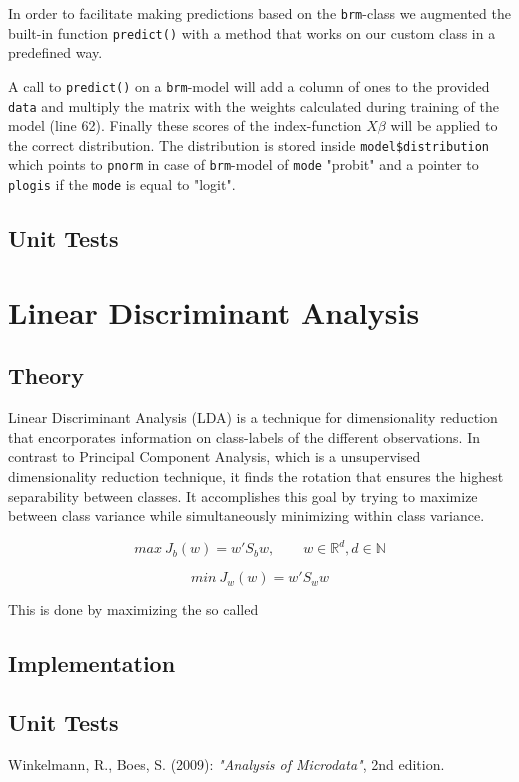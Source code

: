 \documentclass{article}
\begin{document}
In order to facilitate making predictions based on the \texttt{brm}-class we augmented the built-in function \texttt{predict()} with a method that works on our custom class in a predefined way.



A call to \texttt{predict()} on a \texttt{brm}-model will add a column of ones to the provided \texttt{data} and multiply the matrix with the weights calculated during training of the model (line 62). Finally these scores of the index-function $X\beta$ will be applied to the correct distribution. The distribution is stored inside \texttt{model\$distribution} which points to \texttt{pnorm} in case of \texttt{brm}-model of \texttt{mode} "probit" and a pointer to \texttt{plogis} if the \texttt{mode} is equal to "logit". 

\subsection{Unit Tests}


\section{Linear Discriminant Analysis}
\subsection{Theory}

Linear Discriminant Analysis (LDA) is a technique for dimensionality reduction that encorporates information on class-labels of the different observations. In contrast to  Principal Component Analysis, which is a unsupervised dimensionality reduction technique, it finds the rotation that ensures the highest separability between classes. It accomplishes this goal by trying to maximize between class variance while simultaneously minimizing within class variance.

\begin{equation}
max\ J_{b}(w) = w \prime S_{b} w, \qquad w \in \mathbb{R}^d, d \in \mathbb{N}
\end{equation}

\begin{equation}
min\ J_{w}(w) = w \prime S_{w} w
\end{equation}

This is done by maximizing the so called 

\subsection{Implementation}

\subsection{Unit Tests}

\begin{thebibliography}{9}
  Winkelmann, R., Boes, S. (2009): \textit{"Analysis of Microdata"}, 2nd edition.
\end{thebibliography}
\end{document}
